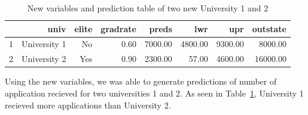 \documentclass{article}\usepackage[]{graphicx}\usepackage[]{color}
\begin{document}
\begin{table}[ht]
\centering
\begin{tabular}{|l|rrrrrrr|}
  \hline
 & univ & elite & gradrate & preds & lwr & upr & outstate \\ 
  \hline
1 & University 1 & No & 0.60 & 7000.00 & 4800.00 & 9300.00 & 8000.00 \\ 
  2 & University 2 & Yes & 0.90 & 2300.00 & 57.00 & 4600.00 & 16000.00 \\ 
   \hline
\end{tabular}
\caption{New variables and prediction table of two new University 1 and 2} 
\label{pred_table}
\end{table}


Using the new variables, we was able to generate predictions of number of application recieved for two universities 1 and 2. As seen in Table~\ref{pred_table}, University 1 recieved more applications than University 2. 
\end{document}
